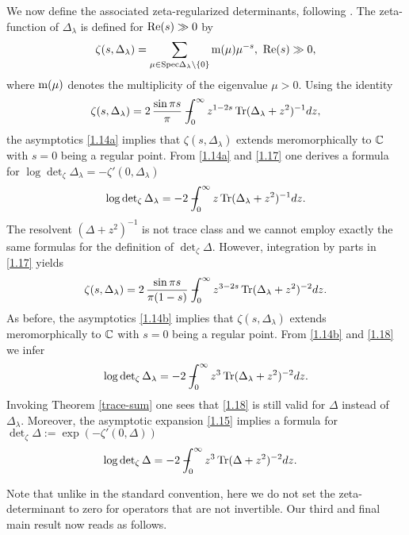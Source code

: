 We now define the associated zeta-regularized determinants, following \cite[(1.7)]{Les:DOR}.
The zeta-function of $\Delta_\lambda$ is defined for $\textup{Re}(s)\gg 0$ by 
\begin{align}\label{zeta}
\zeta (s, \Delta_\lambda) = \sum_{\mu \in \textup{Spec}\Delta_\lambda \backslash \{0\}}
\textup{m($\mu$)} \mu^{-s}, \ \textup{Re}(s) \gg 0,
\end{align}
where $\textup{m($\mu$)}$ denotes the multiplicity of the eigenvalue $\mu >0$. Using
the identity 
\begin{align}\label{1.17}
\zeta (s, \Delta_\lambda) = 2 \, \frac{\sin \pi s}{\pi} 
-\hspace*{-1em}\int_0^\infty z^{1-2s} \operatorname{Tr}(\Delta_\lambda+z^2)^{-1} dz,
\end{align}
the asymptotics \eqref{1.14a} implies that $\zeta (s, \Delta_\lambda)$ extends meromorphically 
to $\mathbb{C}$ with $s=0$ being a regular point. From \eqref{1.14a} and \eqref{1.17} one derives a 
formula for $\log \det_{\zeta} \Delta_\lambda = -\zeta' (0, \Delta_\lambda)$
\begin{equation}
\log \det\nolimits_{\zeta} \Delta_\lambda = -2 -\hspace*{-1em}\int_0^\infty z \operatorname{Tr}(\Delta_\lambda + z^2)^{-1} dz.
\end{equation}
The resolvent $(\Delta+z^2)^{-1}$ is not trace class and we cannot employ exactly the same
formulas for the definition of $\det_{\zeta} \Delta$. However, integration by parts in \eqref{1.17} yields
\begin{align}
\label{1.18}
\zeta (s, \Delta_\lambda) = 2 \, \frac{\sin \pi s}{\pi (1-s)} 
-\hspace*{-1em}\int_0^\infty z^{3-2s} \operatorname{Tr}(\Delta_\lambda+z^2)^{-2} dz.
\end{align}
As before, the asymptotics \eqref{1.14b} implies that $\zeta (s, \Delta_\lambda)$ extends meromorphically 
to $\mathbb{C}$ with $s=0$ being a regular point. From \eqref{1.14b} and \eqref{1.18} we infer
\begin{align}
 \log \det\nolimits_{\zeta} \Delta_\lambda = 
-2 -\hspace*{-1em}\int_0^\infty z^3 \operatorname{Tr}(\Delta_\lambda + z^2)^{-2} dz.
\end{align}
Invoking Theorem \ref{trace-sum} one sees that \eqref{1.18} is still valid 
for $\Delta$ instead of $\Delta_\lambda$. Moreover, the asymptotic expansion \eqref{1.15}
implies a formula for $\det_{\zeta} \Delta := \exp(-\zeta' (0, \Delta))$
\begin{align}
\log \det\nolimits_{\zeta} \Delta &= -2 -\hspace*{-1em}\int_0^\infty z^3 \operatorname{Tr}(\Delta + z^2)^{-2} dz. 
\end{align}

Note that unlike in the standard convention, here we do not set the zeta-determinant to zero 
for operators that are not invertible. Our third and final main result now reads as follows.


